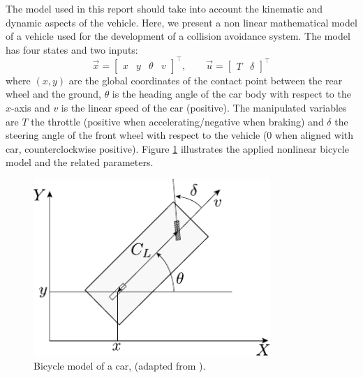 The model used in this report should take into account the kinematic and dynamic aspects of the vehicle. Here, we present a non linear mathematical model of a vehicle used for the development of a collision avoidance system.
The model has four states and two inputs:
\begin{equation*} 
\vec{x}=\begin{bmatrix}
x&y&\theta&v 
\end{bmatrix}^\intercal
,\qquad 
\vec{u}=\begin{bmatrix}
T&\delta 
\end{bmatrix}^\intercal
\end{equation*}
where $(x,y)$ are the global coordinates of the contact point between the rear wheel and the ground, $\theta$ is the heading angle of the car body with respect to the $x$-axis and $v$ is the linear speed of the car (positive). The manipulated variables are $T$ the throttle (positive when accelerating/negative when braking) and $\delta$ the steering angle of the front wheel with respect to the vehicle ($0$ when aligned with car, counterclockwise positive). Figure \ref{fig:car_model} illustrates the applied nonlinear bicycle model and the related parameters.
\begin{figure}[!h]
	\centering
	\includegraphics[width=0.80\textwidth]{../figure/car_model.pdf}
	\caption{Bicycle model of a car, (adapted from \cite{siciliano}).}
	\label{fig:car_model}
\end{figure}

